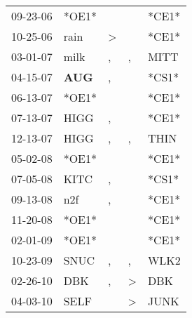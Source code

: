 \begin{supertabular}{p{0.07\textwidth}p{0.06\textwidth}p{0.02\textwidth}p{0.02\textwidth}p{0.06\textwidth}}
 09-23-06\textsuperscript{} &                            *OE1* &                  &               &                            *CE1* \\
 10-25-06\textsuperscript{} &           rain\textsuperscript{} &     \textgreater &               &                            *CE1* \\
 03-01-07\textsuperscript{} &           milk\textsuperscript{} &                , &             , &           MITT\textsuperscript{} \\
 04-15-07\textsuperscript{} &   \textbf{AUG\textsuperscript{}} &                , &               &                            *CS1* \\
 06-13-07\textsuperscript{} &                            *OE1* &                  &               &                            *CE1* \\
 07-13-07\textsuperscript{} &           HIGG\textsuperscript{} &                , &               &                            *CE1* \\
 12-13-07\textsuperscript{} &           HIGG\textsuperscript{} &                , &             , &           THIN\textsuperscript{} \\
 05-02-08\textsuperscript{} &                            *OE1* &                  &               &                            *CE1* \\
 07-05-08\textsuperscript{} &           KITC\textsuperscript{} &                , &               &                            *CS1* \\
 09-13-08\textsuperscript{} &            n2f\textsuperscript{} &                , &               &                            *CE1* \\
 11-20-08\textsuperscript{} &                            *OE1* &                  &               &                            *CE1* \\
 02-01-09\textsuperscript{} &                            *OE1* &                  &               &                            *CE1* \\
 10-23-09\textsuperscript{} &           SNUC\textsuperscript{} &                , &             , &           WLK2\textsuperscript{} \\
 02-26-10\textsuperscript{} &            DBK\textsuperscript{} &                , &  \textgreater &            DBK\textsuperscript{} \\
 04-03-10\textsuperscript{} &           SELF\textsuperscript{} &                  &  \textgreater &           JUNK\textsuperscript{} \\

\end{supertabular}
